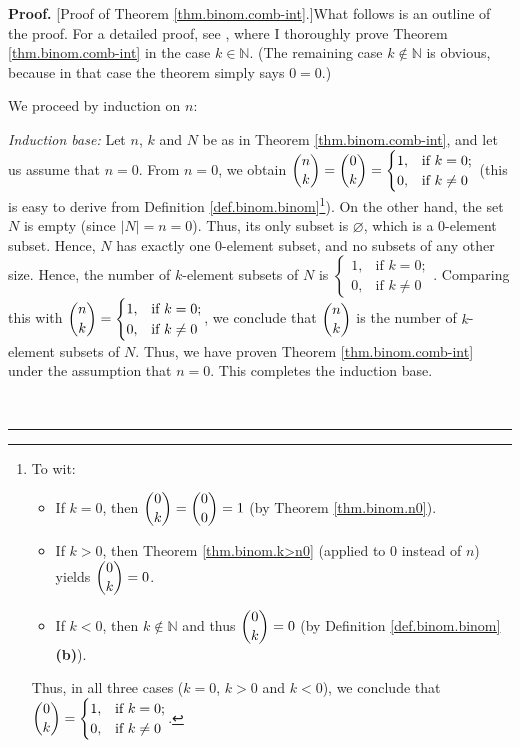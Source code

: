 \documentclass[numbers=enddot,12pt,final,onecolumn,notitlepage]{scrartcl}%
\numberwithin{exer}{subsection}
\theoremstyle{definition}
\newenvironment{proof}[1][Proof]{\noindent\textbf{#1.} }{\ \rule{0.5em}{0.5em}}
\begin{document}
\begin{proof}
[Proof of Theorem \ref{thm.binom.comb-int}.]What follows is an outline of the
proof. For a detailed proof, see \cite[Exercise 3.4]{detnotes}, where I
thoroughly prove Theorem \ref{thm.binom.comb-int} in the case $k\in\mathbb{N}%
$. (The remaining case $k\notin\mathbb{N}$ is obvious, because in that case
the theorem simply says $0=0$.)

We proceed by induction on $n$:

\textit{Induction base:} Let $n$, $k$ and $N$ be as in Theorem
\ref{thm.binom.comb-int}, and let us assume that $n=0$. From $n=0$, we obtain
$\dbinom{n}{k}=\dbinom{0}{k}=%
\begin{cases}
1, & \text{if }k=0;\\
0, & \text{if }k\neq0
\end{cases}
$ (this is easy to derive from Definition \ref{def.binom.binom}\footnote{To
wit:
\par
\begin{itemize}
\item If $k=0$, then $\dbinom{0}{k}=\dbinom{0}{0}=1$ (by Theorem
\ref{thm.binom.n0}).
\par
\item If $k>0$, then Theorem \ref{thm.binom.k>n0} (applied to $0$ instead of
$n$) yields $\dbinom{0}{k}=0$.
\par
\item If $k<0$, then $k\notin\mathbb{N}$ and thus $\dbinom{0}{k}=0$ (by
Definition \ref{def.binom.binom} \textbf{(b)}).
\end{itemize}
\par
Thus, in all three cases ($k=0$, $k>0$ and $k<0$), we conclude that
$\dbinom{0}{k}=%
\begin{cases}
1, & \text{if }k=0;\\
0, & \text{if }k\neq0
\end{cases}
$.}). On the other hand, the set $N$ is empty (since $\left\vert N\right\vert
=n=0$). Thus, its only subset is $\varnothing$, which is a $0$-element subset.
Hence, $N$ has exactly one $0$-element subset, and no subsets of any other
size. Hence, the number of $k$-element subsets of $N$ is $%
\begin{cases}
1, & \text{if }k=0;\\
0, & \text{if }k\neq0
\end{cases}
$. Comparing this with $\dbinom{n}{k}=%
\begin{cases}
1, & \text{if }k=0;\\
0, & \text{if }k\neq0
\end{cases}
$, we conclude that $\dbinom{n}{k}$ is the number of $k$-element subsets of
$N$. Thus, we have proven Theorem \ref{thm.binom.comb-int} under the
assumption that $n=0$. This completes the induction base.


\end{proof}
\end{document}
